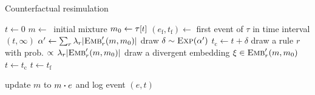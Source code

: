 \newcommand{\EVF}[0]{e_{\text{f}}}
\newcommand{\EVCF}[0]{e_{\text{c}}}

\renewcommand{\algorithmicrequire}{\textbf{Input:}}
\renewcommand{\algorithmicensure}{\textbf{Output:}}

\begin{algorithm}[h]
\caption{Counterfactual resimulation}\label{alg:cosimulation}
\begin{spacing}{  \fi}
\begin{algorithmic}[1]
\vspace{0.2cm}
\STATE $t \gets 0$
\STATE $m \gets\ $ initial mixture
  \STATE $m_0 \gets \TSTATE{t}{\tau}$
  \STATE $(\EVF{}, t_{\text{f}}) \gets $ first event of $\tau$ in time interval $(t, \infty)$
  \vspace{0.1cm}
  \STATE $\alpha' \gets \sum_r {\lambda_r |{\textsc{Emb}}'_{r}(m, m_0)|}$
  \vspace{0.1cm}
  \STATE draw $\delta \sim \textsc{Exp}(\alpha') $
  \STATE $t_{\text{c}} \gets t + \delta$
   \label{cosim:cev}
      \STATE draw a rule $r$ with prob.
      $\propto \, \lambda_r |{\textsc{Emb}}'_{r}(m, m_0)|$
      \STATE  draw a divergent embedding $\xi \in {\textsc{Emb}}'_{r}(m, m_0)$
      \STATE $t \gets t_{\text{c}}$
  \ELSE
      \STATE {$e \gets \EVF{}$}
      \STATE $t \gets t_{\text{f}}$
  \ENDIF

   \label{cosim:blocked}
      \STATE update $m$ to $\UPDATE{m}{e}$ and log event $(e, t)$
  \ENDIF
\ENDWHILE
\vspace{0.1cm}
\end{algorithmic}
\end{spacing}
\end{algorithm}